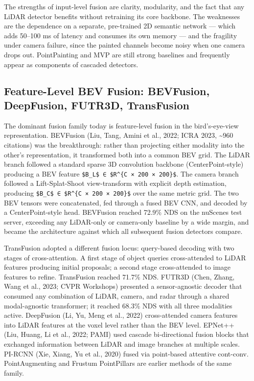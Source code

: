 The strengths of input-level fusion are clarity, modularity, and the fact that any LiDAR detector benefits without retraining its core backbone. The weaknesses are the dependence on a separate, pre-trained 2D semantic network --- which adds 50--100 ms of latency and consumes its own memory --- and the fragility under camera failure, since the painted channels become noisy when one camera drops out. PointPainting and MVP are still strong baselines and frequently appear as components of cascaded detectors.

\subsection{Feature-Level BEV Fusion: BEVFusion, DeepFusion, FUTR3D, TransFusion}\label{feature-level-bev-fusion-bevfusion-deepfusion-futr3d-transfusion}

The dominant fusion family today is feature-level fusion in the bird's-eye-view representation. BEVFusion (Liu, Tang, Amini et al., 2022; ICRA 2023, \textasciitilde960 citations) was the breakthrough: rather than projecting either modality into the other's representation, it transformed both into a common BEV grid. The LiDAR branch followed a standard sparse 3D convolution backbone (CenterPoint-style) producing a BEV feature \texttt{\$B\_L\$\ ∈\ \$R\^{}\{C\ ×\ 200\ ×\ 200\}\$}. The camera branch followed a Lift-Splat-Shoot view-transform with explicit depth estimation, producing \texttt{\$B\_C\$\ ∈\ \$R\^{}\{C\ ×\ 200\ ×\ 200\}\$} over the same metric grid. The two BEV tensors were concatenated, fed through a fused BEV CNN, and decoded by a CenterPoint-style head. BEVFusion reached 72.9\% NDS on the nuScenes test server, exceeding any LiDAR-only or camera-only baseline by a wide margin, and became the architecture against which all subsequent fusion detectors compare.

TransFusion adopted a different fusion locus: query-based decoding with two stages of cross-attention. A first stage of object queries cross-attended to LiDAR features producing initial proposals; a second stage cross-attended to image features to refine. TransFusion reached 71.7\% NDS. FUTR3D (Chen, Zhang, Wang et al., 2023; CVPR Workshops) presented a sensor-agnostic decoder that consumed any combination of LiDAR, camera, and radar through a shared modal-agnostic transformer; it reached 68.3\% NDS with all three modalities active. DeepFusion (Li, Yu, Meng et al., 2022) cross-attended camera features into LiDAR features at the voxel level rather than the BEV level. EPNet++ (Liu, Huang, Li et al., 2022; PAMI) used cascade bi-directional fusion blocks that exchanged information between LiDAR and image branches at multiple scales. PI-RCNN (Xie, Xiang, Yu et al., 2020) fused via point-based attentive cont-conv. PointAugmenting and Frustum PointPillars are earlier methods of the same family.

